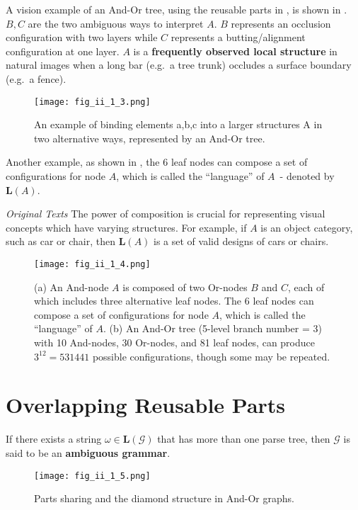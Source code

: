 \documentclass[../Notes_of_CaRiVaC.tex]{subfiles}
\begin{document}
A vision example of an And-Or tree, using the reusable parts in
, is shown in . $B, C$ are the two ambiguous ways to
interpret $A$. $B$ represents an occlusion configuration with two layers while
$C$ represents a butting/alignment configuration at one layer.  $A$ is a
\textbf{frequently observed local structure} in natural images when a long bar
(e.g.\ a tree trunk) occludes a surface boundary (e.g.\ a fence).
%
\begin{figure}[!htpb]
  \centering
  \texttt{[image: fig\_ii\_1\_3.png]}
  \caption{An example of binding elements a,b,c into a larger structures A in
    two alternative ways, represented by an And-Or tree.}%
  \label{fig:ii.1.3}
\end{figure}
%

Another example, as shown in , the 6 leaf nodes can compose a set
of configurations for node $A$, which is called the ``language'' of $A$~-
denoted by $\mathbf{L}(A)$.

\begin{textbox}{\textit{Original Texts}}
The power of composition is crucial for representing visual concepts which have
varying structures. For example, if $A$ is an object category, such as car or
chair, then $\mathbf{L}(A)$ is a set of valid designs of cars or chairs.
\end{textbox}
%
\begin{figure}[!htpb]
  \centering
  \texttt{[image: fig\_ii\_1\_4.png]}
  \caption{(a) An And-node $A$ is composed of two Or-nodes $B$ and $C$, each of
    which includes three alternative leaf nodes. The 6 leaf nodes can compose a
    set of configurations for node $A$, which is called the ``language'' of
    $A$. (b) An And-Or tree (5-level branch number = 3) with 10 And-nodes, 30
    Or-nodes, and 81 leaf nodes, can produce $3^{12} = 531441$ possible
    configurations, though some may be repeated.}%
  \label{fig:ii.1.4}
\end{figure}
%

\section{Overlapping Reusable Parts}%
\label{sec:ii.1.3}
If there exists a string $\omega \in \mathbf{L}(\mathcal{G})$ that has more
than one parse tree, then $\mathcal{G}$ is said to be an \textbf{ambiguous
grammar}.
%
\begin{figure}[!htpb]
  \centering
  \texttt{[image: fig\_ii\_1\_5.png]}
  \caption{Parts sharing and the diamond structure in And-Or graphs.}%
  \label{fig:ii.1.5}
\end{figure}
%
\end{document}
